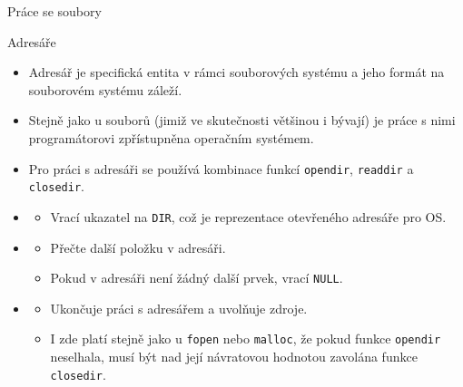 \documentclass[handout]{beamer}
\begin{document}
\begin{frame}{Práce se soubory}
\end{frame}
\begin{frame}{Adresáře}
    \begin{itemize}
        \item Adresář je specifická entita v rámci souborových systému a jeho formát na souborovém systému záleží.
        \item Stejně jako u souborů (jimiž ve skutečnosti většinou i bývají) je práce s nimi
            programátorovi zpřístupněna operačním systémem.
        \item Pro práci s adresáři se používá kombinace funkcí \texttt{opendir}, \texttt{readdir} a \texttt{closedir}.
        \item {}
            \begin{itemize}
                \item Vrací ukazatel na \texttt{DIR}, což je reprezentace otevřeného adresáře pro OS.
            \end{itemize}
        \item {}
            \begin{itemize}
                \item Přečte další položku v adresáři.
                \item Pokud v adresáři není žádný další prvek, vrací \texttt{NULL}.
            \end{itemize}
        \item {}
            \begin{itemize}
                \item Ukončuje práci s adresářem a uvolňuje zdroje.
                \item I zde platí stejně jako u \texttt{fopen} nebo \texttt{malloc}, že pokud funkce \texttt{opendir} neselhala, musí být
                    nad její návratovou hodnotou zavolána funkce \texttt{closedir}.
            \end{itemize}
    \end{itemize}
\end{frame}
\end{document}

